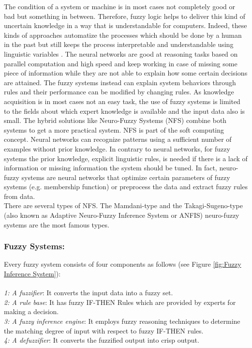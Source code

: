 The condition of a system or machine is in most cases not completely good or bad but something in between. Therefore, fuzzy logic helps to deliver this kind of uncertain knowledge in a way that is understandable for computers. Indeed, these kinds of approaches automatize the processes which should be done by a human in the past but still keeps the process interpretable and understandable using linguistic variables \cite{zeraoulia2005simple}.
The neural networks are good at reasoning tasks based on parallel computation and high speed and keep working in case of missing some piece of information while they are not able to explain how some certain decisions are attained. The fuzzy systems instead can explain system behaviors through rules and their performance can be modified by changing rules. As knowledge acquisition is in most cases not an easy task, the use of fuzzy systems is limited to the fields about which expert knowledge is available and the input data also is small.
The hybrid solutions like Neuro-Fuzzy Systems (NFS) combine both systems to get a more practical system. NFS is part of the soft computing concept.  
Neural networks can recognize patterns using a sufficient number of examples without prior knowledge. In contrary to neural networks, for fuzzy systems the prior knowledge, explicit linguistic rules, is needed if there is a lack of information or missing information the system should be tuned. In fact, neuro-fuzzy systems are neural networks that optimize certain parameters of fuzzy systems (e.g. membership function) or preprocess the data and extract fuzzy rules from data.\\
There are several types of NFS. The Mamdani-type and the Takagi-Sugeno-type \cite{Rutkowski2009} (also known as Adaptive Neuro-Fuzzy Inference System or ANFIS) neuro-fuzzy systems are the most famous types.

\subsubsection*{Fuzzy Systems:}
Every fuzzy system \cite{Rutkowski2009} consists of four components as follows (see Figure \ref{fig:Fuzzy Inference System}):\\\\
\textit{1: A fuzzifier}: It converts the input data into a fuzzy set.\\
\textit{2: A rule base}: It has fuzzy IF-THEN Rules which are provided by experts for making a decision.\\
\textit{3: A fuzzy inference engine}: It employs fuzzy reasoning techniques to determine the matching degree of input with respect to fuzzy IF-THEN rules.\\
\textit{4: A defuzzifier}: It converts the fuzzified output into crisp output.

